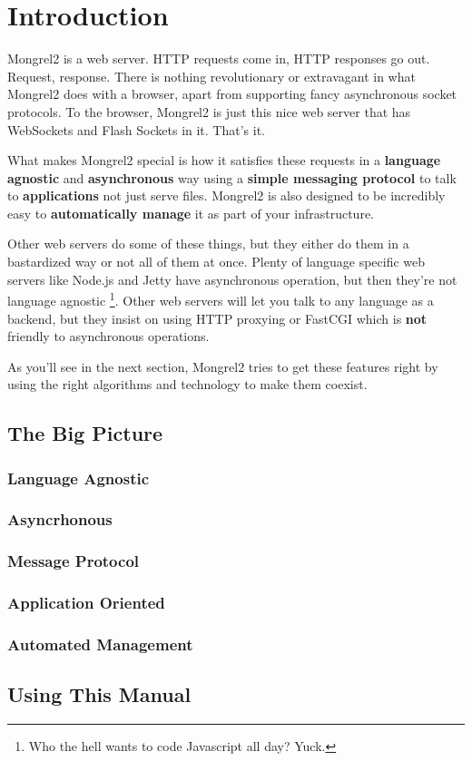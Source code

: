 \chapter*{Introduction}

Mongrel2 is a web server.  HTTP requests come in, HTTP responses go out.
Request, response.  There is nothing revolutionary or extravagant in what
Mongrel2 does with a browser, apart from supporting fancy asynchronous socket
protocols.  To the browser, Mongrel2 is just this nice web server that has
WebSockets and Flash Sockets in it.  That's it.

What makes Mongrel2 special is how it satisfies these requests in a {\bf
language agnostic} and {\bf asynchronous} way using a {\bf simple messaging
protocol} to talk to {\bf applications} not just serve files.  Mongrel2 is also
designed to be incredibly easy to {\bf automatically manage} it as part of your
infrastructure.

Other web servers do some of these things, but they either do them in a bastardized
way or not all of them at once.  Plenty of language specific web servers like Node.js
and Jetty have asynchronous operation, but then they're not language agnostic
\footnote{Who the hell wants to code Javascript all day?  Yuck.}.  Other web servers
will let you talk to any language as a backend, but they insist on using HTTP
proxying or FastCGI which is {\bf not} friendly to asynchronous operations.

As you'll see in the next section, Mongrel2 tries to get these features right by
using the right algorithms and technology to make them coexist.


\section{The Big Picture}


\subsection{Language Agnostic}


\subsection{Asyncrhonous}


\subsection{Message Protocol}


\subsection{Application Oriented}


\subsection{Automated Management}


\section{Using This Manual}



